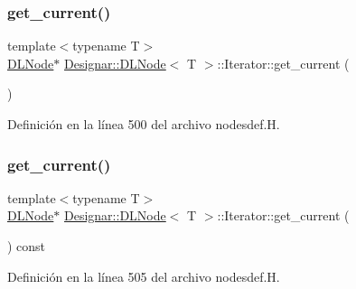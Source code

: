 \subsubsection{\texorpdfstring{get\+\_\+current()}{get\_current()}\hspace{0.1cm}{\footnotesize\ttfamily [1/2]}}
{\footnotesize\ttfamily template$<$typename T$>$ \\
\hyperlink{class_designar_1_1_d_l_node}{D\+L\+Node}$\ast$ \hyperlink{class_designar_1_1_d_l_node}{Designar\+::\+D\+L\+Node}$<$ T $>$\+::Iterator\+::get\+\_\+current (\begin{DoxyParamCaption}{ }\end{DoxyParamCaption})\hspace{0.3cm}{\ttfamily [inline]}}



Definición en la línea 500 del archivo nodesdef.\+H.

\mbox{\label{class_designar_1_1_d_l_node_1_1_iterator_a1ea2b71da1fbc4970b9a1c170ddacb13}} 
\subsubsection{\texorpdfstring{get\+\_\+current()}{get\_current()}\hspace{0.1cm}{\footnotesize\ttfamily [2/2]}}
{\footnotesize\ttfamily template$<$typename T$>$ \\
\hyperlink{class_designar_1_1_d_l_node}{D\+L\+Node}$\ast$ \hyperlink{class_designar_1_1_d_l_node}{Designar\+::\+D\+L\+Node}$<$ T $>$\+::Iterator\+::get\+\_\+current (\begin{DoxyParamCaption}{ }\end{DoxyParamCaption}) const\hspace{0.3cm}{\ttfamily [inline]}}



Definición en la línea 505 del archivo nodesdef.\+H.

\mbox{\label{class_designar_1_1_d_l_node_1_1_iterator_a37adeeda3073b950590700c3e22dcf28}} 
